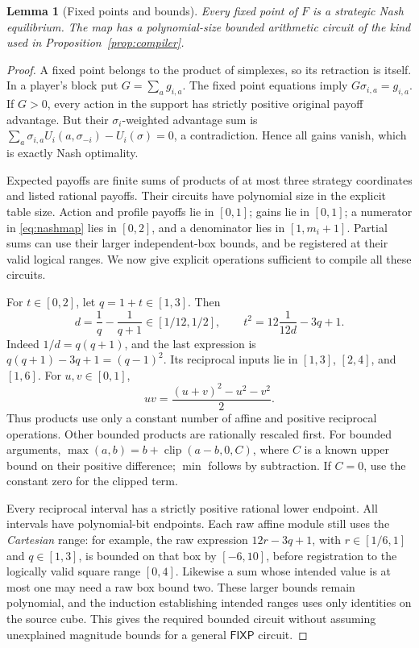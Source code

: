 \documentclass[11pt,a4paper]{article}
\numberwithin{equation}{section}
\newtheorem{lemma}[theorem]{Lemma}
\theoremstyle{definition}
\newcommand{\FIXP}{\mathsf{FIXP}}
\DeclareMathOperator{\clip}{clip}
\begin{document}
\begin{lemma}[Fixed points and bounds]\label{lem:nashmap}
Every fixed point of \(F\) is a strategic Nash equilibrium. The map
has a polynomial-size bounded arithmetic circuit of the kind used
in Proposition~\ref{prop:compiler}.
\end{lemma}
\begin{proof}
A fixed point belongs to the product of simplexes, so its retraction
is itself. In a player's block put \(G=\sum_a g_{i,a}\). The fixed
point equations imply \(G\sigma_{i,a}=g_{i,a}\). If \(G>0\), every
action in the support has strictly positive original payoff advantage.
But their \(\sigma_i\)-weighted advantage sum is
\(\sum_a\sigma_{i,a}U_i(a,\sigma_{-i})-U_i(\sigma)=0\), a
contradiction. Hence all gains vanish, which is exactly Nash optimality.

Expected payoffs are finite sums of products of at most three strategy
coordinates and listed rational payoffs. Their circuits have polynomial
size in the explicit table size. Action and profile payoffs lie in
\([0,1]\); gains lie in \([0,1]\); a numerator in
\eqref{eq:nashmap} lies in \([0,2]\), and a denominator lies in
\([1,m_i+1]\). Partial sums can use their larger independent-box
bounds, and be registered at their valid logical ranges. We now give
explicit operations sufficient to compile all these circuits.

For \(t\in[0,2]\), let \(q=1+t\in[1,3]\). Then
\begin{equation}\label{eq:square}
 d=\frac1q-\frac1{q+1}\in[1/12,1/2],
 \qquad t^2=12\frac1{12d}-3q+1.
\end{equation}
Indeed \(1/d=q(q+1)\), and the last expression is
\(q(q+1)-3q+1=(q-1)^2\).
Its reciprocal inputs lie in \([1,3]\), \([2,4]\), and \([1,6]\).
For \(u,v\in[0,1]\),
\[
 uv=\frac{(u+v)^2-u^2-v^2}{2}.
\]
Thus products use only a constant number of affine and positive
reciprocal operations. Other bounded products are rationally rescaled
first. For bounded arguments,
\(\max(a,b)=b+\clip(a-b,0,C)\), where \(C\) is a known upper bound
on their positive difference; \(\min\) follows by subtraction. If
\(C=0\), use the constant zero for the clipped term.

Every reciprocal interval has a strictly positive rational lower
endpoint. All intervals have polynomial-bit endpoints. Each raw affine
module still uses the \emph{Cartesian} range: for example, the raw
expression \(12r-3q+1\), with \(r\in[1/6,1]\) and \(q\in[1,3]\),
is bounded on that box by \([-6,10]\), before registration to the
logically valid square range \([0,4]\). Likewise a sum whose intended
value is at most one may need a raw box bound two. These larger bounds
remain polynomial, and the induction establishing intended ranges
uses only identities on the source cube. This gives the required
bounded circuit without assuming unexplained magnitude bounds for a
general \(\FIXP\) circuit.
\end{proof}
\end{document}
